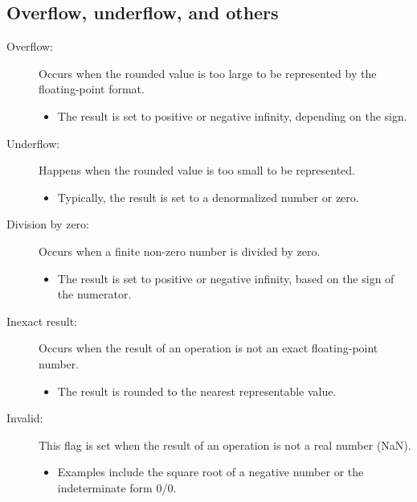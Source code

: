 \documentclass[12pt,openany, tikz,border=10pt]{book}
\begin{document}
			      	\subsection{Overflow, underflow, and others}
			      	\begin{description}
			      		\item[Overflow:] Occurs when the rounded value is too large to be represented by the floating-point format.
			      		\begin{itemize}
			      			\item The result is set to positive or negative infinity, depending on the sign.
			      		\end{itemize}
			      		    
			      		\item[Underflow:] Happens when the rounded value is too small to be represented.
			      		\begin{itemize}
			      			\item Typically, the result is set to a denormalized number or zero.
			      		\end{itemize}
			      		    
			      		\item[Division by zero:] Occurs when a finite non-zero number is divided by zero.
			      		\begin{itemize}
			      			\item The result is set to positive or negative infinity, based on the sign of the numerator.
			      		\end{itemize}
			      		    
			      		\item[Inexact result:] Occurs when the result of an operation is not an exact floating-point number.
			      		\begin{itemize}
			      			\item The result is rounded to the nearest representable value.
			      		\end{itemize}
			      		    
			      		\item[Invalid:] This flag is set when the result of an operation is not a real number (NaN).
			      		\begin{itemize}
			      			\item Examples include the square root of a negative number or the indeterminate form 0/0.
			      		\end{itemize}
			      	\end{description}
			      	
\end{document}

